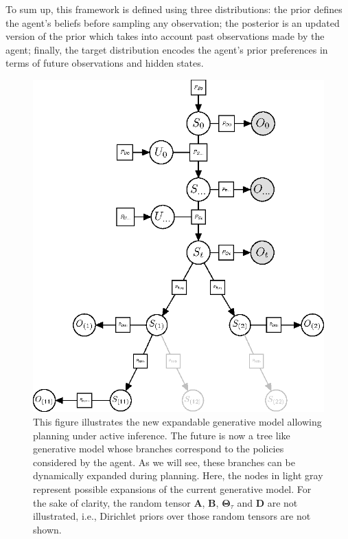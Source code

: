 \documentclass[twoside,11pt]{article}
\begin{document}
To sum up, this framework is defined using three distributions: the prior defines the agent's beliefs before sampling any observation; the posterior is an updated version of the prior which takes into account past observations made by the agent; finally, the target distribution encodes the agent's prior preferences in terms of future observations and hidden states.

\begin{figure}[H]
	\begin{center}
	\includegraphics[scale=1]{BTAI-figure6}
 	\end{center}
\vspace{-0.25cm}
    \caption{
This figure illustrates the new expandable generative model allowing planning under active inference. The future is now a tree like generative model whose branches correspond to the policies considered by the agent. As we will see, these branches can be dynamically expanded during planning. Here, the nodes in light gray represent possible expansions of the current generative model. For the sake of clarity, the random tensor $\bm{A}$, $\bm{B}$, $\bm{\Theta}_\tau$ and $\bm{D}$ are not illustrated, i.e., Dirichlet priors over those random tensors are not shown.}
    \label{fig:AITS}
\end{figure}
\end{document}
